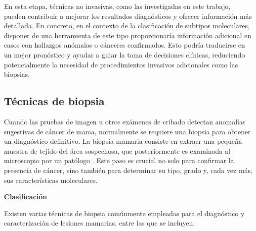 \documentclass[a4paper,10pt]{book}
\begin{document}
En esta etapa, técnicas no invasivas, como las investigadas en este trabajo, pueden contribuir a mejorar los resultados diagnósticos y ofrecer información más detallada. En concreto, en el contexto de la clasificación de subtipos moleculares, disponer de una herramienta de este tipo proporcionaría información adicional en casos con hallazgos anómalos o cánceres confirmados. Esto podría traducirse en un mejor pronóstico y ayudar a guiar la toma de decisiones clínicas, reduciendo potencialmente la necesidad de procedimientos invasivos adicionales como las biopsias.


\subsection{Técnicas de biopsia}

Cuando las pruebas de imagen u otros exámenes de cribado detectan anomalías sugestivas de cáncer de mama, normalmente se requiere una biopsia para obtener un diagnóstico definitivo. La biopsia mamaria consiste en extraer una pequeña muestra de tejido del área sospechosa, que posteriormente es examinada al microscopio por un patólogo \cite{DefinitionBiopsyNCI2011}. Este paso es crucial no solo para confirmar la presencia de cáncer, sino también para determinar su tipo, grado y, cada vez más, sus características moleculares.

\textbf{Clasificación}

Existen varias técnicas de biopsia comúnmente empleadas para el diagnóstico y caracterización de lesiones mamarias, entre las que se incluyen:
\end{document}
